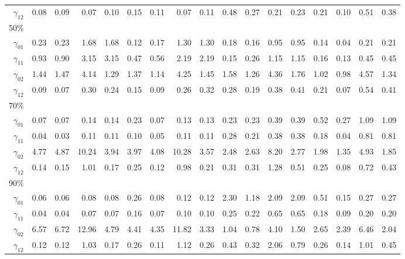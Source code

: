 \documentclass[useAMS,usenatbib,referee]{biom}
\begin{document}
\begin{table}
\begin{tabular}{rrrrrrrrrrrrrrrrr}
$\gamma_{12}$ & 0.08 & 0.09 & 0.07 & 0.10 & 0.15 & 0.11 & 0.07 & 0.11 & 0.48 & 0.27 & 0.21 & 0.23 & 0.21 & 0.10 & 0.51 & 0.38 \\
50\% \\
$\gamma_{01}$ & 0.23 & 0.23 & 1.68 & 1.68 & 0.12 & 0.17 & 1.30 & 1.30 & 0.18 & 0.16 & 0.95 & 0.95 & 0.14 & 0.04 & 0.21 & 0.21 \\
$\gamma_{11}$  & 0.93 & 0.90 & 3.15 & 3.15 & 0.47 & 0.56 & 2.19 & 2.19 & 0.15 & 0.26 & 1.15 & 1.15 & 0.16 & 0.13 & 0.45 & 0.45 \\
$\gamma_{02}$  & 1.44 & 1.47 & 4.14 & 1.29 & 1.37 & 1.14 & 4.25 & 1.45 & 1.58 & 1.26 & 4.36 & 1.76 & 1.02 & 0.98 & 4.57 & 1.34 \\
$\gamma_{12}$  & 0.09 & 0.07 & 0.30 & 0.24 & 0.15 & 0.09 & 0.26 & 0.32 & 0.28 & 0.19 & 0.38 & 0.41 & 0.21 & 0.07 & 0.54 & 0.41 \\
70\% \\
$\gamma_{01}$  & 0.07 & 0.07 & 0.14 & 0.14 & 0.23 & 0.07 & 0.13 & 0.13 & 0.23 & 0.23 & 0.39 & 0.39 & 0.52 & 0.27 & 1.09 & 1.09 \\
$\gamma_{11}$  & 0.04 & 0.03 & 0.11 & 0.11 & 0.10 & 0.05 & 0.11 & 0.11 & 0.28 & 0.21 & 0.38 & 0.38 & 0.18 & 0.04 & 0.81 & 0.81 \\
$\gamma_{02}$  & 4.77 & 4.87 & 10.24 & 3.94 & 3.97 & 4.08 & 10.28 & 3.57 & 2.48 & 2.63 & 8.20 & 2.77 & 1.98 & 1.35 & 4.93 & 1.85 \\
$\gamma_{12}$  & 0.14 & 0.15 & 1.01 & 0.17 & 0.25 & 0.12 & 0.98 & 0.21 & 0.31 & 0.31 & 1.28 & 0.51 & 0.25 & 0.08 & 0.72 & 0.43 \\
90\% \\
$\gamma_{01}$  & 0.06 & 0.06 & 0.08 & 0.08 & 0.26 & 0.08 & 0.12 & 0.12 & 2.30 & 1.18 & 2.09 & 2.09 & 0.51 & 0.15 & 0.27 & 0.27 \\
$\gamma_{11}$  & 0.04 & 0.04 & 0.07 & 0.07 & 0.16 & 0.07 & 0.10 & 0.10 & 0.25 & 0.22 & 0.65 & 0.65 & 0.18 & 0.09 & 0.20 & 0.20 \\
$\gamma_{02}$  & 6.57 & 6.72 & 12.96 & 4.79 & 4.41 & 4.35 & 11.82 & 3.33 & 1.04 & 0.78 & 4.10 & 1.50 & 2.65 & 2.39 & 6.46 & 2.04 \\
$\gamma_{12}$  & 0.12 & 0.12 & 1.03 & 0.17 & 0.26 & 0.11 & 1.12 & 0.26 & 0.43 & 0.32 & 2.06 & 0.79 & 0.26 & 0.14 & 1.01 & 0.45 \\
\hline
  \end{tabular}

\end{table}
\end{document}
